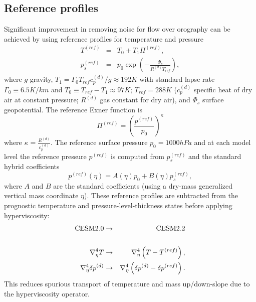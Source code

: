 \documentclass[draft]{agujournal2019}
\begin{document}
\subsection{Reference profiles}
Significant improvement in removing noise for flow over orography can be achieved by using reference profiles for temperature and pressure
\begin{eqnarray}
  T^{(ref)}&=&T_0+T_1 \Pi^{(ref)},\\
  p_s^{(ref)}&=&p_0\exp{\left(-\frac{\Phi_s}{R^{(d)}T_{ref}}\right)},
\end{eqnarray}
 \cite{SJ1991QJRMS} where $g$ gravity, $T_1=\Gamma_0 T_{ref} c_p^{(d)}/g\approx 192K$ with standard lapse rate $\Gamma_0\equiv 6.5K/km$ and $T_0\equiv T_{ref}-T_1\approx 97K$; $T_{ref}=288K$ ($c_p^{(d)}$ specific heat of dry air at constant pressure; $R^{(d)}$ gas constant for dry air), and $\Phi_s$ surface geopotential. The reference Exner function is
\begin{equation}
   \Pi^{(ref)}=\left( \frac{p^{(ref)}}{p_0}\right)^{\kappa}
\end{equation}
where $\kappa=\frac{R^{(d)}}{c_p^{(d)}}$. The reference surface pressure $p_0=1000hPa$ and at each model level the reference pressure $p^{(ref)}$ is computed from $p_s^{(ref)}$ and the standard hybrid coefficients
\begin{equation}
    p^{(ref)}(\eta) = A(\eta)p_0+B(\eta)p_s^{(ref)},
\end{equation}
where $A$ and $B$ are the standard {\color{blue}{hybrid}} coefficients (using a dry-mass generalized vertical mass coordinate $\eta$). These reference profiles are subtracted from the prognostic temperature and pressure-level-thickness states before applying hyperviscosity:
\begin{eqnarray}
   \hbox{CESM2.0}&\rightarrow&\hbox{CESM2.2}\nonumber \\
   && \nonumber \\
  \nabla^4_\eta T &\rightarrow& \nabla^4_\eta \left(T-T^{(ref)}\right),\label{eq:hyperT}\\ 
    \nabla^4_\eta \delta p^{(d)} &\rightarrow& \nabla^4_\eta \left(\delta p^{(d)}-\delta p^{(ref)}\right).\label{eq:hyperDP}
\end{eqnarray}
This reduces spurious transport of temperature and mass up/down-slope due to the hyperviscosity operator. 
\end{document}
